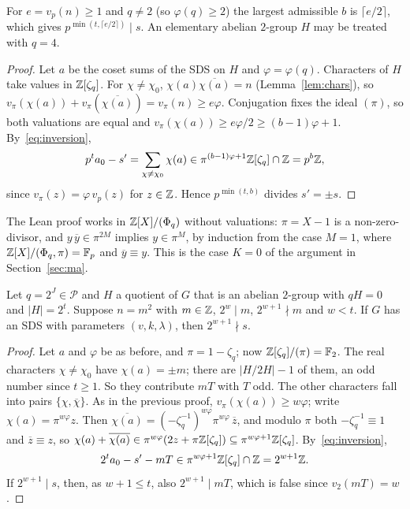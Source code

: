 For $e = v_p(n) \ge 1$ and $q \ne 2$ (so $\varphi(q) \ge 2$) the largest admissible $b$ is
$\lceil e/2 \rceil$, which gives $p^{\min(t, \lceil e/2 \rceil)} \mid s$. An elementary abelian
$2$-group $H$ may be treated with $q = 4$.

\begin{proof}
Let $a$ be the coset sums of the SDS on $H$ and $\varphi = \varphi(q)$. Characters of $H$ take
values in $\mathbb{Z}[\zeta_q]$. For $\chi \ne \chi_0$, $\chi(a)\overline{\chi(a)} = n$
(Lemma~\ref{lem:chars}), so $v_\pi(\chi(a)) + v_\pi(\overline{\chi(a)}) = v_\pi(n) \ge
e\varphi$. Conjugation fixes the ideal $(\pi)$, so both valuations are equal and
$v_\pi(\chi(a)) \ge e\varphi/2 \ge (b-1)\varphi + 1$. By~\eqref{eq:inversion},
\[
  p^t a_0 - s' = \sum_{\chi \ne \chi_0} \chi(a) \in \pi^{(b-1)\varphi + 1}\mathbb{Z}[\zeta_q] \cap \mathbb{Z}
  = p^b \mathbb{Z} ,
\]
since $v_\pi(z) = \varphi\, v_p(z)$ for $z \in \mathbb{Z}$. Hence $p^{\min(t,b)}$ divides $s' = \pm s$.
\end{proof}

The Lean proof works in $\mathbb{Z}[X]/(\Phi_q)$ without valuations: $\pi = X - 1$ is a non-zero-divisor,
and $y\,\overline{y} \in \pi^{2M}$ implies $y \in \pi^M$, by induction from the case $M = 1$, where
$\mathbb{Z}[X]/(\Phi_q, \pi) = \mathbb{F}_p$ and $\overline{y} \equiv y$. This is the case $K = 0$ of the
argument in Section~\ref{sec:ma}.

\begin{theorem}\label{thm:z25b}
Let $q = 2^J \in \mathcal{P}$ and $H$ a quotient of $G$ that is an abelian $2$-group with
$qH = 0$ and $|H| = 2^t$. Suppose $n = m^2$ with $m \in \mathbb{Z}$, $2^w \mid m$, $2^{w+1} \nmid m$ and
$w < t$. If $G$ has an SDS with parameters $(v,k,\lambda)$, then $2^{w+1} \nmid s$.
\end{theorem}

\begin{proof}
Let $a$ and $\varphi$ be as before, and $\pi = 1 - \zeta_q$; now $\mathbb{Z}[\zeta_q]/(\pi) =
\mathbb{F}_2$. The real characters $\chi \ne \chi_0$ have $\chi(a) = \pm m$; there are
$|H/2H| - 1$ of them, an odd number since $t \ge 1$. So they contribute $mT$ with $T$ odd. The
other characters fall into pairs $\{\chi, \overline{\chi}\}$. As in the previous proof,
$v_\pi(\chi(a)) \ge w\varphi$; write $\chi(a) = \pi^{w\varphi} z$. Then
$\overline{\chi(a)} = (-\zeta_q^{-1})^{w\varphi} \pi^{w\varphi}\, \overline{z}$, and modulo $\pi$
both $-\zeta_q^{-1} \equiv 1$ and $\overline{z} \equiv z$, so
$\chi(a) + \overline{\chi(a)} \in \pi^{w\varphi}(2z + \pi\mathbb{Z}[\zeta_q]) \subseteq \pi^{w\varphi+1}
\mathbb{Z}[\zeta_q]$. By~\eqref{eq:inversion},
\[
  2^t a_0 - s' - mT \in \pi^{w\varphi + 1}\mathbb{Z}[\zeta_q] \cap \mathbb{Z} = 2^{w+1}\mathbb{Z} .
\]
If $2^{w+1} \mid s$, then, as $w + 1 \le t$, also $2^{w+1} \mid mT$, which is false since
$v_2(mT) = w$.
\end{proof}

